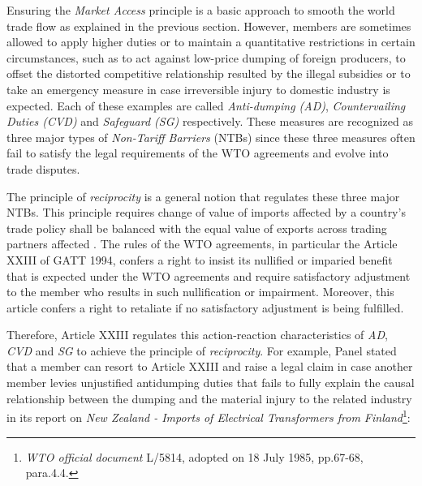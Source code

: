 
 
Ensuring the \textit{Market Access} principle
is a basic approach to smooth the world trade flow as explained in the previous section. %
However, members are sometimes allowed to apply higher duties or to maintain a quantitative restrictions in certain circumstances, such as
to act against low-price dumping of foreign producers, to offset the distorted competitive relationship resulted by the illegal subsidies
or to take an emergency measure in case irreversible injury to domestic industry is expected. Each of these examples
are called \textit{Anti-dumping (AD)}, \textit{Countervailing Duties (CVD)} and \textit{Safeguard (SG)} respectively. These measures are recognized as
three major types of \textit{Non-Tariff Barriers} (NTBs) %
since these three measures often fail to satisfy the legal requirements of the WTO agreements and evolve into trade disputes.
 
The principle of \textit{reciprocity} is a general notion that regulates these three major NTBs.
This principle requires change of value of imports affected by a country's trade policy
shall be balanced with the equal value of exports across trading partners affected \citep{bagwell1999}.
The rules of the WTO agreements, in particular the Article XXIII of GATT 1994,
confers a right to insist its nullified or imparied benefit that is expected under the WTO agreements and require satisfactory adjustment to the member
who results in such nullification or impairment. Moreover, this article confers a right to retaliate if no satisfactory adjustment is being fulfilled.
 
Therefore, Article XXIII regulates this action-reaction characteristics of \textit{AD}, \textit{CVD} and \textit{SG} to achieve the principle of \textit{reciprocity}. %
For example, Panel stated that a member can resort to Article XXIII and raise a legal claim in case another member levies unjustified antidumping duties that fails to fully explain the causal relationship between the dumping and the material injury to the related industry in its report on \textit{New Zealand - Imports of Electrical Transformers from Finland}\footnote{\textit{WTO official document} L/5814, adopted on 18 July 1985, pp.67-68, para.4.4.}:
 
